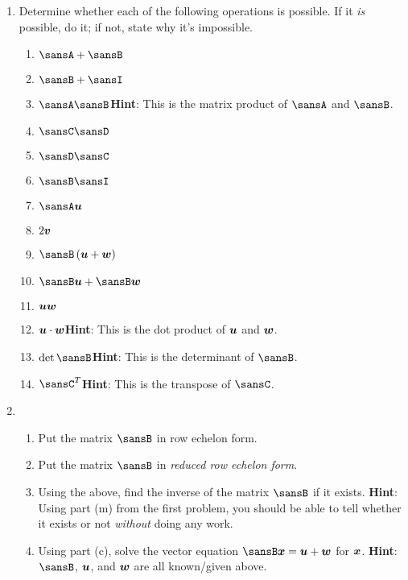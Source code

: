 \documentclass[12 pt]{article}
\newcommand{\hint}[1]{\vspace{3mm}\textbf{Hint}: #1}
\begin{document}
\begin{enumerate}[leftmargin=0in, rightmargin=-0.25in]
	\item Determine whether each of the following operations is possible. If it \textit{is} possible, do it; if not, state why it's impossible.
	\begin{enumerate}
		\item $\sansA + \sansB$
		\item $\sansB + \sansI$
		\item $\sansA\sansB$\quad\quad\hint{This is the matrix product of $\sansA$ and $\sansB$.}
		\item $\sansC\sansD$
		\item $\sansD\sansC$
		\newpage
		\item $\sansB\sansI$
		\item $\sansA\vect{u}$
		\item $2\boldsymbol{v}$
		\item $\sansB\left(\vect{u}+\vect{w}\right)$
		\item $\sansB\vect{u}+\sansB\vect{w}$
		\item $\boldsymbol{u}\boldsymbol{w}$
		\item $\boldsymbol{u}\cdot\boldsymbol{w}$\quad\quad\hint{This is the dot product of $\boldsymbol{u}$ and $\boldsymbol{w}$.}
		\item $\det\sansB$\quad\quad\hint{This is the determinant of $\sansB$.}
		\item $\sansC^T$\quad\quad\hint{This is the transpose of $\sansC$.}
	\end{enumerate}

	\item \begin{enumerate}[itemsep=4.5in]
		\item Put the matrix $\sansB$ in row echelon form.

		\item Put the matrix $\sansB$ in \textit{reduced row echelon form}.
		\item Using the above, find the inverse of the matrix $\sansB$ if it exists. \hint{Using part (m) from the first problem, you should be able to tell whether it exists or not \textit{without} doing any work.}
		\item Using part (c), solve the vector equation $\sansB\vect{x}=\vect{u}+\vect{w}$ for $\boldsymbol{x}$. \hint{$\sansB$, $\boldsymbol{u}$, and $\boldsymbol{w}$ are all known/given above.}
	\end{enumerate}
\end{enumerate}
\end{document}
